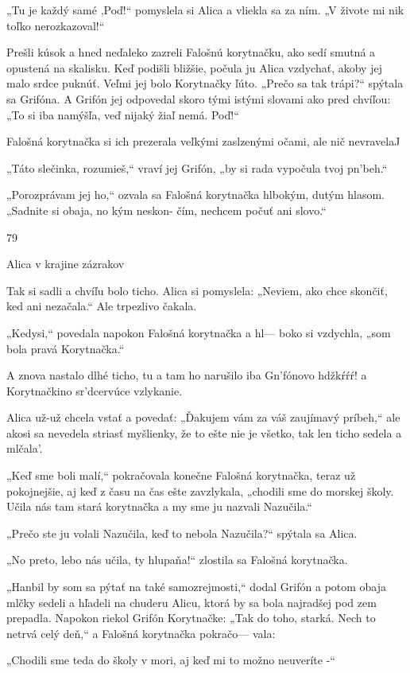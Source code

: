 \documentclass[12pt]{book}
\begin{document}
\begin{Parallel}[p]{}{}
{„Tu je každý samé ,Poď!“ pomyslela si Alica a vliekla sa
za ním. „V živote mi nik toľko nerozkazoval!“

Prešli kúsok a hned neďaleko zazreli Falošnú korytnačku,
ako sedí smutná a opustená na skalisku. Keď podišli bližšie,
počula ju Alica vzdychať, akoby jej malo srdce puknúť.
Veľmi jej bolo Korytnačky ľúto. „Prečo sa tak trápi?“
spýtala sa Grifóna. A Grifón jej odpovedal skoro tými istými
slovami ako pred chvíľou: „To si iba namýšľa, veď nijaký
žiaľ nemá. Poď!“

Falošná korytnačka si ich prezerala veľkými zaslzenými
očami, ale nič nevravelaJ

„Táto slečinka, rozumieš,“ vraví jej Grifón, „by si rada
vypočula tvoj pn'beh.“

„Porozprávam jej ho,“ ozvala sa Falošná korytnačka
hlbokým, dutým hlasom. „Sadnite si obaja, no kým neskon-
čím, nechcem počuť ani slovo.“

79

Alica v krajine zázrakov

Tak si sadli a chvíľu bolo ticho. Alica si pomyslela:
„Neviem, ako chce skončiť, ked ani nezačala.“ Ale trpezlivo
čakala.

„Kedysi,“ povedala napokon Falošná korytnačka a hl—
boko si vzdychla, „som bola pravá Korytnačka.“

A znova nastalo dlhé ticho, tu a tam ho narušilo iba
Gn'fónovo hdžkŕŕŕ! a Korytnačkino sr'dcervúce vzlykanie.

Alica už-už chcela vstať a povedať: „Ďakujem vám za váš
zaujímavý príbeh,“ ale akosi sa nevedela striasť myšlienky,
že to ešte nie je všetko, tak len ticho sedela a mlčala'.

„Keď sme boli malí,“ pokračovala konečne Falošná
korytnačka, teraz už pokojnejšie, aj keď z času na čas ešte
zavzlykala, „chodili sme do morskej školy. Učila nás tam
stará korytnačka a my sme ju nazvali Nazučila.“

„Prečo ste ju volali Nazučila, keď to nebola Nazučila?“
spýtala sa Alica.

„No preto, lebo nás učila, ty hlupaňa!“ zlostila sa Falošná
korytnačka.

„Hanbil by som sa pýtať na také samozrejmosti,“ dodal
Grifón a potom obaja mlčky sedeli a hľadeli na chuderu
Alicu, ktorá by sa bola najradšej pod zem prepadla.
Napokon riekol Grifón Korytnačke: „Tak do toho, starká.
Nech to netrvá celý deň,“ a Falošná korytnačka pokračo—
vala:

„Chodili sme teda do školy v mori, aj keď mi to možno
neuveríte -“

}
\end{Parallel}
\end{document}
